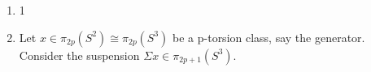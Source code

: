 \documentclass[10pt,a4paper]{article}
\begin{document}
\begin{enumerate}
\item 1
\item Let $x\in\pi_{2p}(S^2)\cong \pi_{2p}(S^3)$ be a p-torsion class, say the generator. Consider the suspension $\Sigma x\in \pi_{2p+1}(S^3)$. 
\end{enumerate}
\end{document}
